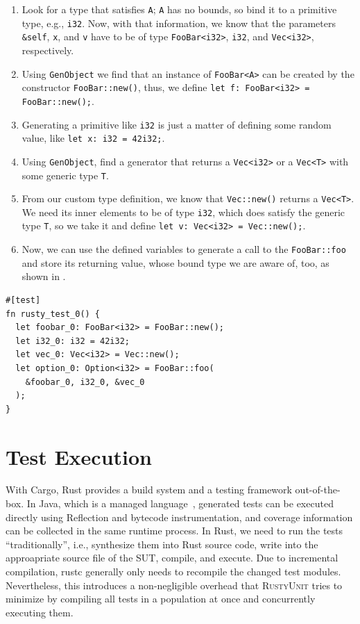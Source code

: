 \documentclass[paper=a4,%
  twoside,%
  BCOR4mm,%
  abstract=true,%
  toc=bibliography,%
  chapterprefix=true,%
  toc=bibliographynumbered,%
  open=right,%
  english,%
  pagesize=pdftex]{scrreprt}
\newcommand{\tech}{\textsc{RustyUnit}\xspace}
\newcommand{\sut}{\ac{SUT}\xspace}
\begin{document}
\begin{enumerate}
    \item Look for a type that satisfies \texttt{A}; \texttt{A} has no bounds, so bind it to a primitive type, e.g., \texttt{i32}. Now, with that information, we know that the parameters \texttt{\string&self}, \texttt{x}, and \texttt{v} have to be of type \texttt{FooBar<i32>}, \texttt{i32}, and \texttt{Vec<i32>}, respectively.
    \item Using \texttt{GenObject} we find that an instance of \texttt{FooBar<A>} can be created by the constructor \texttt{FooBar::new()}, thus, we define \texttt{let f: FooBar<i32> = FooBar::new();}.
    \item Generating a primitive like \texttt{i32} is just a matter of defining some random value, like \texttt{let x: i32 = 42i32;}.
    \item Using \texttt{GenObject}, find a generator that returns a \texttt{Vec<i32>} or a \texttt{Vec<T>} with some generic type \texttt{T}.
    \item From our custom type definition, we know that \texttt{Vec::new()} returns a \texttt{Vec<T>}. We need its inner elements to be of type \texttt{i32}, which does satisfy the generic type \texttt{T}, so we take it and define \texttt{let v: Vec<i32> = Vec::new();}.
    \item Now, we can use the defined variables to generate a call to the \texttt{FooBar::foo} and store its returning value, whose bound type we are aware of, too, as shown in .
\end{enumerate}

\begin{lstlisting}[style=boxed, caption={An example test that invokes \texttt{FooBar::foo}}, label=lst:example-generated-test]
#[test]
fn rusty_test_0() {
  let foobar_0: FooBar<i32> = FooBar::new();
  let i32_0: i32 = 42i32;
  let vec_0: Vec<i32> = Vec::new();
  let option_0: Option<i32> = FooBar::foo(
    &foobar_0, i32_0, &vec_0
  );
}
\end{lstlisting}

\section{Test Execution}
With Cargo, Rust provides a build system and a testing framework out-of-the-box. In Java, which is a managed language~\cite{Gough2005}, generated tests can be executed directly using Reflection and bytecode instrumentation, and coverage information can be collected in the same runtime process. In Rust, we need to run the tests ``traditionally'', i.e., synthesize them into Rust source code, write into the approapriate source file of the \sut, compile, and execute. Due to incremental compilation, rustc generally only needs to recompile the changed test modules. Nevertheless, this introduces a non-negligible overhead that \tech tries to minimize by compiling all tests in a population at once and concurrently executing them.
\end{document}
